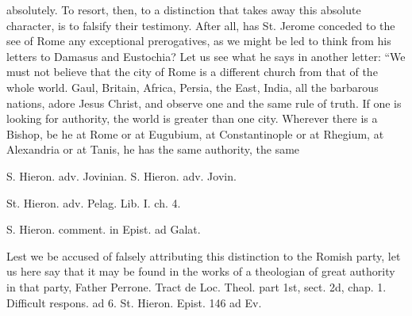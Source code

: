 absolutely. To resort, then, to a distinction that takes away this absolute character, is to falsify their testimony. After all, has St. Jerome conceded to the see of Rome any exceptional prerogatives, as we might be led to think from his letters to Damasus and Eustochia? Let us see what he says in another letter: “We must not believe that the city of Rome is a different church from that of the whole world. Gaul, Britain, Africa, Persia, the East, India, all the barbarous nations, adore Jesus Christ, and observe one and the same rule of truth. If one is looking for authority, the world is greater than one city. Wherever there is a Bishop, be he at Rome or at Eugubium, at Constantinople or at Rhegium, at Alexandria or at Tanis, he has the same authority, the same

S. Hieron. adv. Jovinian. S. Hieron. adv. Jovin.

St. Hieron. adv. Pelag. Lib. I. ch. 4.

S. Hieron. comment. in Epist. ad Galat.

Lest we be accused of falsely attributing this distinction to the Romish party, let us here say that it may be found in the works of a theologian of great authority in that party, Father Perrone. Tract de Loc. Theol. part 1st, sect. 2d, chap. 1. Difficult respons. ad 6. St. Hieron. Epist. 146 ad Ev.

